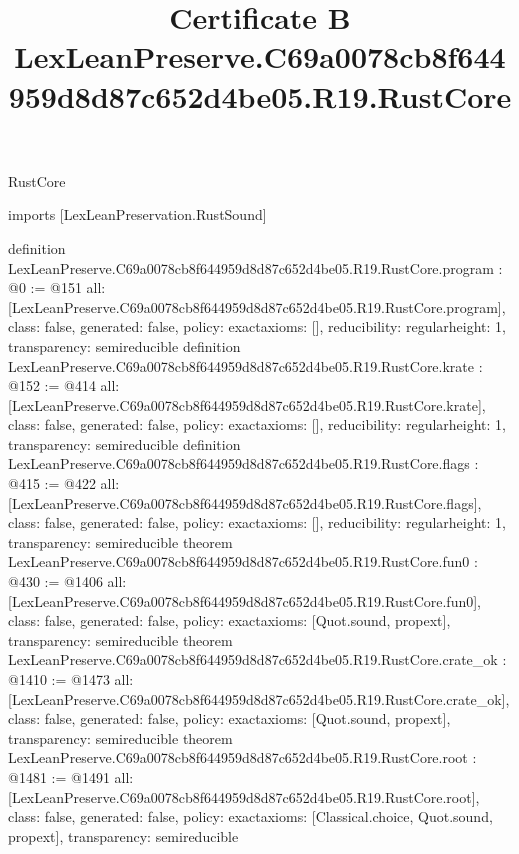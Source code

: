 \begin{lexlean}{RustCore}
\title{Certificate B LexLeanPreserve.C69a0078cb8f644959d8d87c652d4be05.R19.RustCore}
\begin{coremodule}
imports [LexLeanPreservation.RustSound]

definition LexLeanPreserve.C69a0078cb8f644959d8d87c652d4be05.R19.RustCore.program : @0 := @151 {
  all: [LexLeanPreserve.C69a0078cb8f644959d8d87c652d4be05.R19.RustCore.program],
  class: false,
  generated: false,
  policy: exact{axioms: []},
  reducibility: regular{height: 1},
  transparency: semireducible
}
definition LexLeanPreserve.C69a0078cb8f644959d8d87c652d4be05.R19.RustCore.krate : @152 := @414 {
  all: [LexLeanPreserve.C69a0078cb8f644959d8d87c652d4be05.R19.RustCore.krate],
  class: false,
  generated: false,
  policy: exact{axioms: []},
  reducibility: regular{height: 1},
  transparency: semireducible
}
definition LexLeanPreserve.C69a0078cb8f644959d8d87c652d4be05.R19.RustCore.flags : @415 := @422 {
  all: [LexLeanPreserve.C69a0078cb8f644959d8d87c652d4be05.R19.RustCore.flags],
  class: false,
  generated: false,
  policy: exact{axioms: []},
  reducibility: regular{height: 1},
  transparency: semireducible
}
theorem LexLeanPreserve.C69a0078cb8f644959d8d87c652d4be05.R19.RustCore.fun0 : @430 := @1406 {
  all: [LexLeanPreserve.C69a0078cb8f644959d8d87c652d4be05.R19.RustCore.fun0],
  class: false,
  generated: false,
  policy: exact{axioms: [Quot.sound, propext]},
  transparency: semireducible
}
theorem LexLeanPreserve.C69a0078cb8f644959d8d87c652d4be05.R19.RustCore.crate_ok : @1410 := @1473 {
  all: [LexLeanPreserve.C69a0078cb8f644959d8d87c652d4be05.R19.RustCore.crate_ok],
  class: false,
  generated: false,
  policy: exact{axioms: [Quot.sound, propext]},
  transparency: semireducible
}
theorem LexLeanPreserve.C69a0078cb8f644959d8d87c652d4be05.R19.RustCore.root : @1481 := @1491 {
  all: [LexLeanPreserve.C69a0078cb8f644959d8d87c652d4be05.R19.RustCore.root],
  class: false,
  generated: false,
  policy: exact{axioms: [Classical.choice, Quot.sound, propext]},
  transparency: semireducible
}


\end{coremodule}
\end{lexlean}
